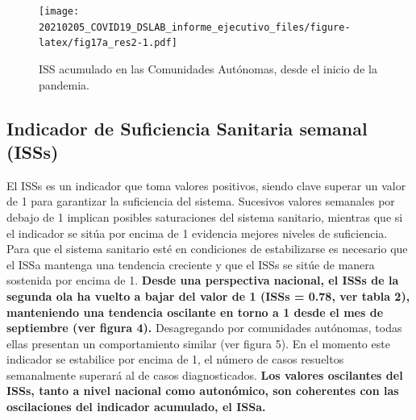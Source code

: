 \documentclass[
  11pt,
]{article}
\begin{document}
\vspace{0.2cm}

\begin{figure}
\centering
\texttt{[image: 20210205\_COVID19\_DSLAB\_informe\_ejecutivo\_files/figure-latex/fig17a\_res2-1.pdf]}
\caption{\label{fig:fig17a_res} ISS acumulado en las Comunidades
Autónomas, desde el inicio de la pandemia.}
\end{figure}

\newpage
\setcounter{page}{6}

\hypertarget{indicador-de-suficiencia-sanitaria-semanal-isss}{%
\subsection{Indicador de Suficiencia Sanitaria semanal
(ISSs)}\label{indicador-de-suficiencia-sanitaria-semanal-isss}}

El ISSs es un indicador que toma valores positivos, siendo clave superar
un valor de 1 para garantizar la suficiencia del sistema. Sucesivos
valores semanales por debajo de 1 implican posibles saturaciones del
sistema sanitario, mientras que si el indicador se sitúa por encima de 1
evidencia mejores niveles de suficiencia. Para que el sistema sanitario
esté en condiciones de estabilizarse es necesario que el ISSa mantenga
una tendencia creciente y que el ISSs se sitúe de manera sostenida por
encima de 1. \textbf{Desde una perspectiva nacional, el ISSs de la
segunda ola ha vuelto a bajar del valor de 1 (ISSs = 0.78, ver tabla 2),
manteniendo una tendencia oscilante en torno a 1 desde el mes de
septiembre (ver figura 4).} Desagregando por comunidades autónomas,
todas ellas presentan un comportamiento similar (ver figura 5). En el
momento este indicador se estabilice por encima de 1, el número de casos
resueltos semanalmente superará al de casos diagnosticados. \textbf{Los
valores oscilantes del ISSs, tanto a nivel nacional como autonómico, son
coherentes con las oscilaciones del indicador acumulado, el ISSa.}
\end{document}
